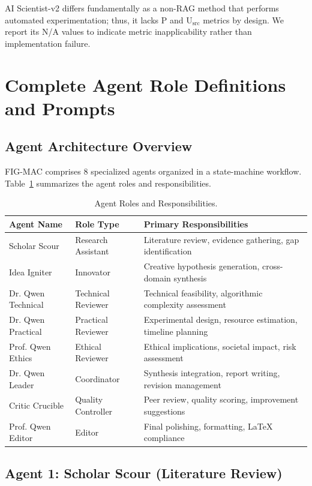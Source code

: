 \documentclass[runningheads]{llncs}
\begin{document}
AI Scientist-v2 differs fundamentally as a non-RAG method that performs automated experimentation; thus, it lacks P and U$_{\text{src}}$ metrics by design. We report its N/A values to indicate metric inapplicability rather than implementation failure.


\section{Complete Agent Role Definitions and Prompts}
\label{app:agent_prompts}

\subsection{Agent Architecture Overview}

FIG-MAC comprises 8 specialized agents organized in a state-machine workflow. Table~\ref{tab:agent_roles} summarizes the agent roles and responsibilities.

\begin{table}[h]
\centering
\small
\begin{tabular}{llp{6cm}}
\toprule
\textbf{Agent Name} & \textbf{Role Type} & \textbf{Primary Responsibilities} \\
\midrule
Scholar Scour & Research Assistant & Literature review, evidence gathering, gap identification \\
Idea Igniter & Innovator & Creative hypothesis generation, cross-domain synthesis \\
Dr. Qwen Technical & Technical Reviewer & Technical feasibility, algorithmic complexity assessment \\
Dr. Qwen Practical & Practical Reviewer & Experimental design, resource estimation, timeline planning \\
Prof. Qwen Ethics & Ethical Reviewer & Ethical implications, societal impact, risk assessment \\
Dr. Qwen Leader & Coordinator & Synthesis integration, report writing, revision management \\
Critic Crucible & Quality Controller & Peer review, quality scoring, improvement suggestions \\
Prof. Qwen Editor & Editor & Final polishing, formatting, LaTeX compliance \\
\bottomrule
\end{tabular}
\caption{Agent Roles and Responsibilities.}
\label{tab:agent_roles}
\end{table}

\subsection{Agent 1: Scholar Scour (Literature Review)}
\end{document}
